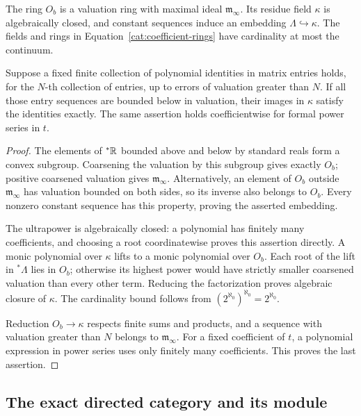 \begin{lemma}\label{cat:residue}
The ring \(O_b\) is a valuation ring with maximal ideal
\(\mathfrak m_\infty\).  Its residue field \(\kappa\) is algebraically
closed, and constant sequences induce an embedding
\(\Lambda\hookrightarrow\kappa\).  The fields and rings in
Equation~\eqref{cat:coefficient-rings} have cardinality at most the
continuum.

Suppose a fixed finite collection of polynomial identities in matrix
entries holds, for the \(N\)-th collection of entries, up to errors of
valuation greater than \(N\).  If all those entry sequences are bounded
below in valuation, their images in \(\kappa\) satisfy the identities
exactly.  The same assertion holds coefficientwise for formal power
series in \(t\).
\end{lemma}

\begin{proof}
The elements of \({}^*\mathbb R\) bounded above and below by standard reals form
a convex subgroup.  Coarsening the valuation by this subgroup gives
exactly \(O_b\); positive coarsened valuation gives
\(\mathfrak m_\infty\).  Alternatively, an element of \(O_b\) outside
\(\mathfrak m_\infty\) has valuation bounded on both sides, so its inverse
also belongs to \(O_b\).  Every nonzero constant sequence has this
property, proving the asserted embedding.

The ultrapower is algebraically closed: a polynomial has finitely many
coefficients, and choosing a root coordinatewise proves this assertion
directly.  A monic polynomial over \(\kappa\) lifts to a monic polynomial
over \(O_b\).  Each root of the lift in \({}^*\Lambda\) lies in \(O_b\);
otherwise its highest power would have strictly smaller coarsened
valuation than every other term.  Reducing the factorization proves
algebraic closure of \(\kappa\).  The cardinality bound follows from
\((2^{\aleph_0})^{\aleph_0}=2^{\aleph_0}\).

Reduction \(O_b\to\kappa\) respects finite sums and products, and a sequence
with valuation greater than \(N\) belongs to \(\mathfrak m_\infty\).
For a fixed coefficient of \(t\), a polynomial expression in power
series uses only finitely many coefficients.  This proves the last
assertion.
\end{proof}

\subsection{The exact directed category and its module}

